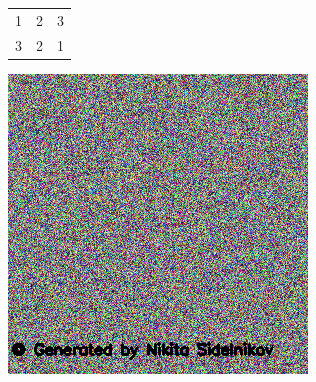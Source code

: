 \documentclass{article}
\begin{document}
\begin{center}
\begin{tabular}{ |c|c|c| }
 \hline
 1 & 2 & 3 \\
 3 & 2 & 1 \\
 \hline
\end{tabular}
\end{center}
\includegraphics{img}
\end{document}
